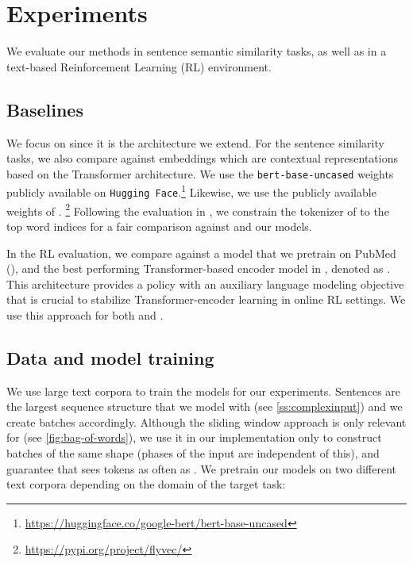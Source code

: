 \section{Experiments}\label{sec:experiments}
We evaluate our methods in sentence semantic similarity tasks, as well as in a text-based Reinforcement Learning (RL) environment.

\subsection{Baselines}
We focus on \flyvec since it is the architecture we extend.
For the sentence similarity tasks, we also compare against \bert embeddings which are contextual representations based on the Transformer architecture.
We use the \texttt{bert-base-uncased} weights publicly available on \texttt{Hugging Face}.\footnote{\url{https://huggingface.co/google-bert/bert-base-uncased}}
Likewise, we use the publicly available weights of \flyvec. \footnote{\url{https://pypi.org/project/flyvec/}}
Following the evaluation in \cite{flyvec}, we constrain the tokenizer of \bert to the top  word indices for a fair comparison against \flyvec and our models.

\par
In the RL evaluation, we compare against a \flyvec model that we pretrain on PubMed (\pflyvec), and the best performing Transformer-based encoder model in \cite{ddxgym}, denoted as \transmlm.
This architecture provides a policy with an auxiliary language modeling objective that is crucial to stabilize Transformer-encoder learning in online RL settings.
We use this approach for both \pflyvec and \methodname.

\subsection{Data and model training}\label{ss:pretraining}
We use large text corpora to train the models for our experiments.
Sentences are the largest sequence structure that we model with \methodname (see \cref{ss:complexinput}) and we create batches accordingly.
Although the sliding window approach is only relevant for \flyvec (see \cref{fig:bag-of-words}), we use it in our implementation only to construct batches of the same shape (phases of the input are independent of this), and guarantee that \methodname sees tokens as often as \flyvec. 
We pretrain our models on two different text corpora depending on the domain of the target task:

